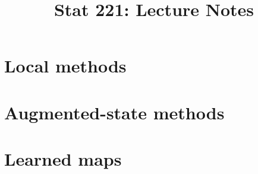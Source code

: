 \documentclass[11pt]{article}
\title{Stat 221: Lecture Notes}
\author{}
\date{}
\begin{document}
\maketitle
\tableofcontents



\part{Local methods}




\part{Augmented-state methods}




\part{Learned maps}




\clearpage


\end{document}
